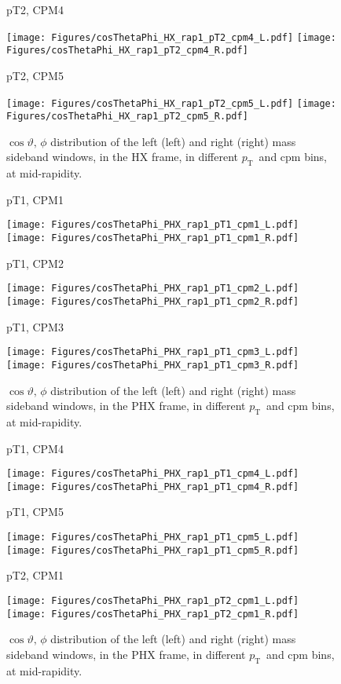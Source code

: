 \documentclass[12pt]{article}
\newcommand{\pt}{$p_{\mathrm{T}}$}
\begin{document}
\begin{figure}[htbp]
\centering
\caption{pT2, CPM4}
\texttt{[image: Figures/cosThetaPhi\_HX\_rap1\_pT2\_cpm4\_L.pdf]}
\texttt{[image: Figures/cosThetaPhi\_HX\_rap1\_pT2\_cpm4\_R.pdf]}
\caption{pT2, CPM5}
\texttt{[image: Figures/cosThetaPhi\_HX\_rap1\_pT2\_cpm5\_L.pdf]}
\texttt{[image: Figures/cosThetaPhi\_HX\_rap1\_pT2\_cpm5\_R.pdf]}
\caption{$\cos\vartheta,\,\phi$ distribution of the left (left) and
  right (right) mass sideband windows, in the HX frame, in different
  \pt\ and cpm bins, at mid-rapidity.}
\end{figure}
\clearpage


\begin{figure}[htbp]
\centering
\caption{pT1, CPM1}
\texttt{[image: Figures/cosThetaPhi\_PHX\_rap1\_pT1\_cpm1\_L.pdf]}
\texttt{[image: Figures/cosThetaPhi\_PHX\_rap1\_pT1\_cpm1\_R.pdf]}
\caption{pT1, CPM2}
\texttt{[image: Figures/cosThetaPhi\_PHX\_rap1\_pT1\_cpm2\_L.pdf]}
\texttt{[image: Figures/cosThetaPhi\_PHX\_rap1\_pT1\_cpm2\_R.pdf]}
\caption{pT1, CPM3}
\texttt{[image: Figures/cosThetaPhi\_PHX\_rap1\_pT1\_cpm3\_L.pdf]}
\texttt{[image: Figures/cosThetaPhi\_PHX\_rap1\_pT1\_cpm3\_R.pdf]}
\caption{$\cos\vartheta,\,\phi$ distribution of the left (left) and
  right (right) mass sideband windows, in the PHX frame, in different
  \pt\ and cpm bins, at mid-rapidity.}
\end{figure}
\clearpage

\begin{figure}[htbp]
\centering
\caption{pT1, CPM4}
\texttt{[image: Figures/cosThetaPhi\_PHX\_rap1\_pT1\_cpm4\_L.pdf]}
\texttt{[image: Figures/cosThetaPhi\_PHX\_rap1\_pT1\_cpm4\_R.pdf]}
\caption{pT1, CPM5}
\texttt{[image: Figures/cosThetaPhi\_PHX\_rap1\_pT1\_cpm5\_L.pdf]}
\texttt{[image: Figures/cosThetaPhi\_PHX\_rap1\_pT1\_cpm5\_R.pdf]}
\caption{pT2, CPM1}
\texttt{[image: Figures/cosThetaPhi\_PHX\_rap1\_pT2\_cpm1\_L.pdf]}
\texttt{[image: Figures/cosThetaPhi\_PHX\_rap1\_pT2\_cpm1\_R.pdf]}
\caption{$\cos\vartheta,\,\phi$ distribution of the left (left) and
  right (right) mass sideband windows, in the PHX frame, in different
  \pt\ and cpm bins, at mid-rapidity.}
\end{figure}
\clearpage
\end{document}
